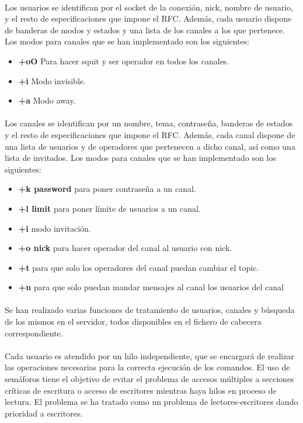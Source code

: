 \documentclass{mathnotes}
\begin{document}
\paragraph{}
Los usuarios se identifican por el socket de la conexión, nick, nombre de usuario, y el resto de especificaciones que impone el RFC. Además, cada usuario dispone de banderas de modos y estados y una lista de los canales a los que pertenece.
Los modos para canales que se han implementado son los siguientes:
\begin{itemize}
\item \textbf{+oO} Para hacer squit y ser operador en todos los canales.
\item \textbf{+i} Modo invisible.
\item \textbf{+a} Modo away.
\end{itemize}
\paragraph{}
Los canales se identifican por un nombre, tema, contraseña, banderas de estados y el resto de especificaciones que impone el RFC. Además, cada canal dispone de una lista de usuarios y de operadores que pertenecen a dicho canal, así como una lista de invitados.
Los modos para canales que se han implementado son los siguientes:
\begin{itemize}
\item \textbf{+k password} para poner contraseña a un canal.
\item \textbf{+l limit} para poner límite de usuarios a un canal.
\item \textbf{+i} modo invitación.
\item \textbf{+o nick} para hacer operador del canal al usuario con nick.
\item \textbf{+t} para que solo los operadores del canal puedan cambiar el topic.
\item \textbf{+n} para que solo puedan mandar mensajes al canal los usuarios del canal
\end{itemize}
\paragraph{}
Se han realizado varias funciones de tratamiento de usuarios, canales y búsqueda de los mismos en el servidor, todos disponibles en el fichero de cabecera correspondiente.
\paragraph{}
Cada usuario es atendido por un hilo independiente, que se encargará de realizar las operaciones necesarias para la correcta ejecución de los comandos.
El uso de semáforos tiene el objetivo de evitar el problema de accesos múltiples a secciones críticas de escritura o acceso de escritores mientras haya hilos en proceso de lectura.
El problema se ha tratado como un problema de lectores-escritores dando prioridad a escritores.
\end{document}
